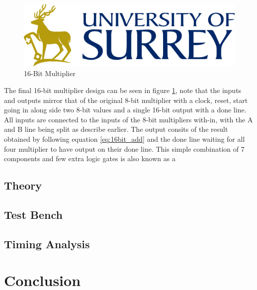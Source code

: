 \documentclass[11pt]{article}
\begin{document}
\begin{figure}[H]         
    \centering
    \includegraphics[width=.5\textwidth]{Logo.png}
    \caption{16-Bit Multiplier}
    \label{fig:8bit}
\end{figure} 

The final 16-bit multiplier design can be seen in figure \ref{fig:8bit},
note that the inputs and outputs mirror that of the original 8-bit multiplier with a clock, reset, start going in along side two 8-bit values and a single 16-bit output with a done line.
All inputs are connected to the inputs of the 8-bit multipliers with-in, with the A and B line being split as describe earlier. 
The output consits of the result obtained by following equation \ref{eq:16bit_add} and the done line waiting for all four multiplier to have output on their done line.
This simple combination of 7 components and few extra logic gates is also known as a 

\subsection{Theory}
\subsection{Test Bench}
\subsection{Timing Analysis}

\section{Conclusion}

\printbibliography
\end{document}
